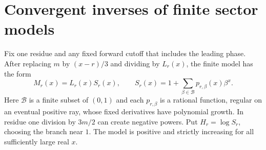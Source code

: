 \documentclass[11pt,letterpaper]{article}
\numberwithin{equation}{section}
\theoremstyle{definition}\newtheorem{definition}[theorem]{Definition}
\theoremstyle{remark}\newtheorem{remark}[theorem]{Remark}
\begin{document}
\section{Convergent inverses of finite sector models}\label{det:dia:sec:convergent}
Fix one residue and any fixed forward cutoff that includes the leading
phase. After replacing $m$ by $(x-r)/3$ and dividing by $L_r(x)$, the
finite model has the form
\begin{equation}\label{det:dia:eq:model}
 M_r(x)=L_r(x)S_r(x),\qquad
 S_r(x)=1+\sum_{\beta\in\mathcal B}p_{r,\beta}(x)\beta^x.
\end{equation}
Here $\mathcal B$ is a finite subset of $(0,1)$ and each $p_{r,\beta}$
is a rational function, regular on an eventual positive ray, whose
fixed derivatives have polynomial growth. In residue one division by
$3m/2$ can create negative powers. Put $H_r=\log S_r$, choosing the
branch near $1$. The model is positive and strictly increasing for all
sufficiently large real $x$.
\end{document}
